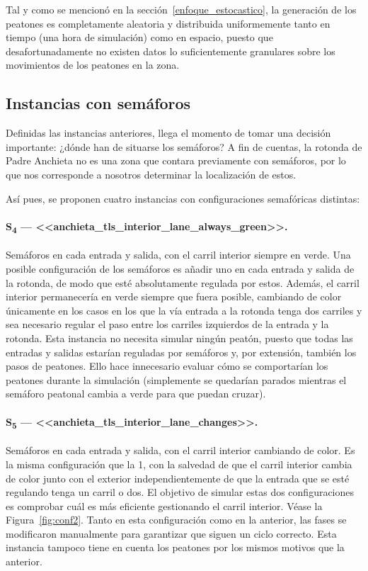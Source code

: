 Tal y como se mencionó en la sección~\ref{enfoque_estocastico}, la generación de los peatones es completamente aleatoria y distribuida uniformemente tanto en tiempo (una hora de simulación) como en espacio, puesto que desafortunadamente no existen datos lo suficientemente granulares sobre los movimientos de los peatones en la zona.


\subsection{Instancias con semáforos}
\label{subsec:instancias}

Definidas las instancias anteriores, llega el momento de tomar una decisión importante: ¿dónde han de situarse los semáforos? A fin de cuentas, la rotonda de Padre Anchieta no es una zona que contara previamente con semáforos, por lo que nos corresponde a nosotros determinar la localización de estos.

Así pues, se proponen cuatro instancias con configuraciones semafóricas distintas:

\paragraph{S\textsubscript{4} --- <<anchieta\_tls\_interior\_lane\_always\_green>>.} Semáforos en cada entrada y salida, con el carril interior siempre en verde. Una posible configuración de los semáforos es añadir uno en cada entrada y salida de la rotonda, de modo que esté absolutamente regulada por estos. Además, el carril interior permanecería en verde siempre que fuera posible, cambiando de color únicamente en los casos en los que la vía entrada a la rotonda tenga dos carriles y sea necesario regular el paso entre los carriles izquierdos de la entrada y la rotonda. Esta instancia no necesita simular ningún peatón, puesto que todas las entradas y salidas estarían reguladas por semáforos y, por extensión, también los pasos de peatones. Ello hace innecesario evaluar cómo se comportarían los peatones durante la simulación (simplemente se quedarían parados mientras el semáforo peatonal cambia a verde para que puedan cruzar).

\paragraph{S\textsubscript{5} --- <<anchieta\_tls\_interior\_lane\_changes>>.} Semáforos en cada entrada y salida, con el carril interior cambiando de color. Es la misma configuración que la 1, con la salvedad de que el carril interior cambia de color junto con el exterior independientemente de que la entrada que se esté regulando tenga un carril o dos. El objetivo de simular estas dos configuraciones es comprobar cuál es más eficiente gestionando el carril interior. Véase la Figura~\ref{fig:conf2}. Tanto en esta configuración como en la anterior, las fases se modificaron manualmente para garantizar que siguen un ciclo correcto. Esta instancia tampoco tiene en cuenta los peatones por los mismos motivos que la anterior.

